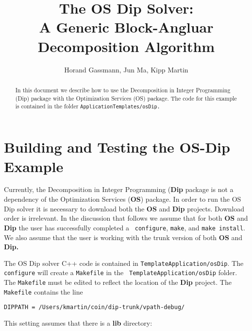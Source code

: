 \documentclass[11pt]{article}
\renewcommand{\_}{{\char"5F}}
\renewcommand{\{}{{\char"7B}}
\renewcommand{\}}{{\char"7D}}
\renewcommand{\^}{{\char"0D}}
\renewcommand{\'}{{\char"0D}}
\begin{document}
\title{The OS Dip Solver:\\
A Generic Block-Angluar Decomposition Algorithm}
\vskip 2in
\author{Horand Gassmann, Jun Ma,  Kipp Martin}
\maketitle

\begin{abstract}
In this document we describe how to use the Decomposition in Integer Programming
(Dip) package with the Optimization Services (OS) package.  The code for this
example is contained in the folder {\tt  ApplicationTemplates/osDip.}

\end{abstract}


\newpage
{}


 

\newpage

\section{Building and Testing the OS-Dip Example}\label{section:build}

Currently, the Decomposition in Integer Programming ({\bf Dip} package is not a
dependency of the Optimization Services ({\bf OS}) package. In order to run the
OS Dip solver it is necessary to download both the {\bf OS} and {\bf  Dip}
projects. Download order is irrelevant. 
In the discussion that follows we assume that for both 
{\bf OS} and {\bf Dip} the user has successfully completed a {\tt
configure}, {\tt make}, and {\tt make install}. We also assume
that the user is working with the trunk version of both {\bf OS} and {\bf Dip.}


The OS Dip solver C++ code is contained in {\tt TemplateApplication/osDip}.
 The {\tt configure}  will create a {\tt Makefile}  in the {\tt
 TemplateApplication/osDip} folder. The {\tt Makefile} must be edited to reflect
 the location of the {\bf Dip} project. The {\tt Makefile} contains the
 line

\begin{verbatim}
DIPPATH = /Users/kmartin/coin/dip-trunk/vpath-debug/
\end{verbatim}

This setting assumes that there is a {\bf lib} directory:
\end{document}
